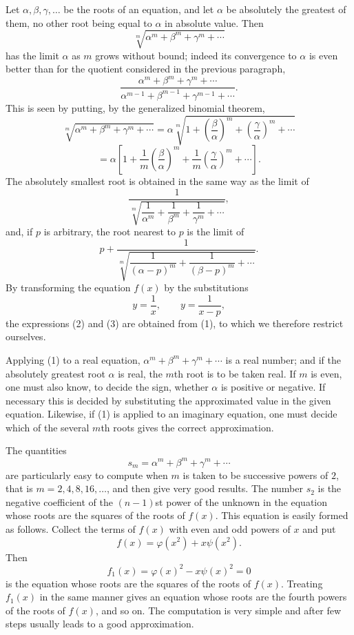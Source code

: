 \documentclass[11pt]{article}
\begin{document}
Let $\alpha,\beta,\gamma,\ldots$ be the roots of an equation, and let $\alpha$ be absolutely the greatest of them, no other root being equal to $\alpha$ in absolute value. Then
\begin{equation}
        \sqrt[m]{\alpha^m+\beta^m+\gamma^m+\cdots}
\tag{1}
\end{equation}
has the limit $\alpha$ as $m$ grows without bound; indeed its convergence to $\alpha$ is even better than for the quotient considered in the previous paragraph,
\[
        \frac{\alpha^m+\beta^m+\gamma^m+\cdots}
             {\alpha^{m-1}+\beta^{m-1}+\gamma^{m-1}+\cdots}.
\]
This is seen by putting, by the generalized binomial theorem,
\[
\sqrt[m]{\alpha^m+\beta^m+\gamma^m+\cdots}
=\alpha\sqrt[m]{1+\left(\frac{\beta}{\alpha}\right)^m+
                  \left(\frac{\gamma}{\alpha}\right)^m+\cdots}
\]
\[
=\alpha\left[1+\frac1m\left(\frac{\beta}{\alpha}\right)^m
+\frac1m\left(\frac{\gamma}{\alpha}\right)^m+\cdots\right].
\]
The absolutely smallest root is obtained in the same way as the limit of
\begin{equation}
        \frac{1}{\sqrt[m]{\dfrac1{\alpha^m}+\dfrac1{\beta^m}
        +\dfrac1{\gamma^m}+\cdots}},
\tag{2}
\end{equation}
and, if $p$ is arbitrary, the root nearest to $p$ is the limit of
\begin{equation}
        p+\frac{1}{\sqrt[m]{\dfrac1{(\alpha-p)^m}
        +\dfrac1{(\beta-p)^m}+\cdots}}.
\tag{3}
\end{equation}
By transforming the equation $f(x)$ by the substitutions
\[
        y=\frac1x,\qquad y=\frac1{x-p},
\]
the expressions (2) and (3) are obtained from (1), to which we therefore restrict ourselves.

Applying (1) to a real equation, $\alpha^m+\beta^m+\gamma^m+\cdots$ is a real number; and if the absolutely greatest root $\alpha$ is real, the $m$th root is to be taken real. If $m$ is even, one must also know, to decide the sign, whether $\alpha$ is positive or negative. If necessary this is decided by substituting the approximated value in the given equation. Likewise, if (1) is applied to an imaginary equation, one must decide which of the several $m$th roots gives the correct approximation.

The quantities
\[
        s_m=\alpha^m+\beta^m+\gamma^m+\cdots
\]
are particularly easy to compute when $m$ is taken to be successive powers of $2$, that is $m=2,4,8,16,\ldots$, and then give very good results. The number $s_2$ is the negative coefficient of the $(n-1)$st power of the unknown in the equation whose roots are the squares of the roots of $f(x)$. This equation is easily formed as follows. Collect the terms of $f(x)$ with even and odd powers of $x$ and put
\[
        f(x)=\varphi(x^2)+x\psi(x^2).
\]
Then
\[
        f_1(x)=\varphi(x)^2-x\psi(x)^2=0
\]
is the equation whose roots are the squares of the roots of $f(x)$. Treating $f_1(x)$ in the same manner gives an equation whose roots are the fourth powers of the roots of $f(x)$, and so on. The computation is very simple and after few steps usually leads to a good approximation.
\end{document}

